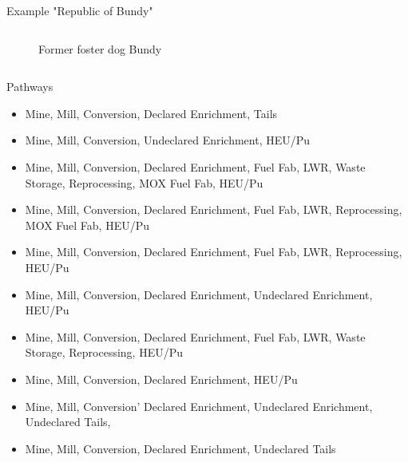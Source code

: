 \begin{frame}{Example "Republic of Bundy"}
\begin{columns}
\begin{figure}[h]
        \caption{\small Former foster dog Bundy}
        \label{fig:my_label}
    \end{figure}
    \end{columns}
\end{frame}

\begin{frame}{Pathways}
    \begin{itemize}
        \item Mine, Mill, Conversion, Declared Enrichment, Tails
        \item Mine, Mill, Conversion, Undeclared Enrichment, HEU/Pu
        \item Mine, Mill, Conversion, Declared Enrichment, Fuel Fab, LWR, Waste Storage, Reprocessing, MOX Fuel Fab, HEU/Pu
        \item Mine, Mill, Conversion, Declared Enrichment, Fuel Fab, LWR, Reprocessing, MOX Fuel Fab, HEU/Pu
        \item Mine, Mill, Conversion, Declared Enrichment, Fuel Fab, LWR, Reprocessing, HEU/Pu
        \item Mine, Mill, Conversion, Declared Enrichment, Undeclared Enrichment, HEU/Pu
        \item Mine, Mill, Conversion, Declared Enrichment, Fuel Fab, LWR, Waste Storage, Reprocessing, HEU/Pu
        \item Mine, Mill, Conversion, Declared Enrichment, HEU/Pu
        \item Mine, Mill, Conversion' Declared Enrichment, Undeclared Enrichment, Undeclared Tails,
        \item Mine, Mill, Conversion, Declared Enrichment, Undeclared Tails
    \end{itemize}
\end{frame}

